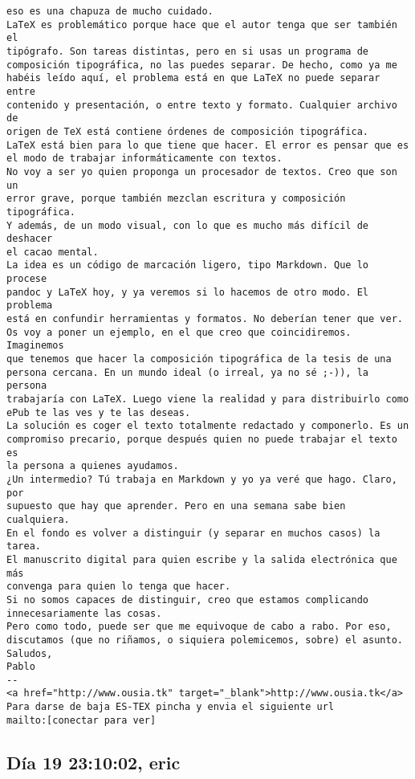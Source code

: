 \documentclass[a4paper,10pt]{article}
\begin{document}
\begin{lstlisting}
eso es una chapuza de mucho cuidado.
LaTeX es problemático porque hace que el autor tenga que ser también el
tipógrafo. Son tareas distintas, pero en si usas un programa de
composición tipográfica, no las puedes separar. De hecho, como ya me
habéis leído aquí, el problema está en que LaTeX no puede separar entre
contenido y presentación, o entre texto y formato. Cualquier archivo de
origen de TeX está contiene órdenes de composición tipográfica.
LaTeX está bien para lo que tiene que hacer. El error es pensar que es
el modo de trabajar informáticamente con textos.
No voy a ser yo quien proponga un procesador de textos. Creo que son un
error grave, porque también mezclan escritura y composición tipográfica.
Y además, de un modo visual, con lo que es mucho más difícil de deshacer
el cacao mental.
La idea es un código de marcación ligero, tipo Markdown. Que lo procese
pandoc y LaTeX hoy, y ya veremos si lo hacemos de otro modo. El problema
está en confundir herramientas y formatos. No deberían tener que ver.
Os voy a poner un ejemplo, en el que creo que coincidiremos. Imaginemos
que tenemos que hacer la composición tipográfica de la tesis de una
persona cercana. En un mundo ideal (o irreal, ya no sé ;-)), la persona
trabajaría con LaTeX. Luego viene la realidad y para distribuirlo como
ePub te las ves y te las deseas.
La solución es coger el texto totalmente redactado y componerlo. Es un
compromiso precario, porque después quien no puede trabajar el texto es
la persona a quienes ayudamos.
¿Un intermedio? Tú trabaja en Markdown y yo ya veré que hago. Claro, por
supuesto que hay que aprender. Pero en una semana sabe bien cualquiera.
En el fondo es volver a distinguir (y separar en muchos casos) la tarea.
El manuscrito digital para quien escribe y la salida electrónica que más
convenga para quien lo tenga que hacer.
Si no somos capaces de distinguir, creo que estamos complicando
innecesariamente las cosas.
Pero como todo, puede ser que me equivoque de cabo a rabo. Por eso,
discutamos (que no riñamos, o siquiera polemicemos, sobre) el asunto.
Saludos,
Pablo
-- 
<a href="http://www.ousia.tk" target="_blank">http://www.ousia.tk</a>
Para darse de baja ES-TEX pincha y envia el siguiente url
mailto:[conectar para ver]

\end{lstlisting}

\subsection{Día 19 23:10:02, eric}
\end{document}
